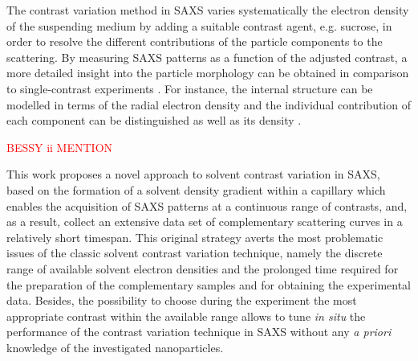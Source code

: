 The contrast variation method in SAXS varies systematically the electron density of the suspending medium by adding a suitable contrast agent, e.g. sucrose, in order to resolve the different contributions of the particle components to the scattering. By measuring SAXS patterns as a function of the adjusted contrast, a more detailed insight into the particle morphology can be obtained in comparison to single-contrast experiments \citep{bolze_situ_2004}. For instance, the internal structure can be modelled in terms of the radial electron density \citep{dingenouts_radial_1994,dingenouts_analysis_1999,ballauff_analysis_2011,ballauff_small-angle_1996} and the individual contribution of each component can be distinguished \citep{beyer_saxs_1990,grunder_analysis_1991,grunder_small-angle_1993,ottewill_characterization_1995,bolze_small-angle_1997,dingenouts_structure_1994} as well as its density \citep{mykhaylyk_application_2007}.

\textcolor{red}{BESSY ii MENTION}

This work proposes a novel approach to solvent contrast variation in SAXS, based on the formation of a solvent density gradient within a capillary which enables the acquisition of SAXS patterns at a continuous range of contrasts, and, as a result, collect an extensive data set of complementary scattering curves in a relatively short timespan. This original strategy averts the most problematic issues of the classic solvent contrast variation technique, namely the discrete range of available solvent electron densities and the prolonged time required for the preparation of the complementary samples and for obtaining the experimental data. Besides, the possibility to choose during the experiment the most appropriate contrast within the available range allows to tune \emph{in situ} the performance of the contrast variation technique in SAXS without any \emph{a priori} knowledge of the investigated nanoparticles.

